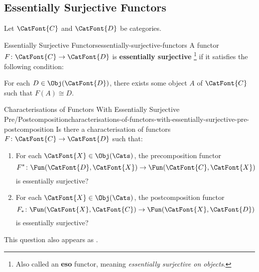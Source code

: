 \subsection{Essentially Surjective Functors}\label{subsection-essentially-surjective-functors}
Let $\CatFont{C}$ and $\CatFont{D}$ be categories.
\begin{definition}{Essentially Surjective Functors}{essentially-surjective-functors}%
    A functor $F\colon\CatFont{C}\to\CatFont{D}$ is \textbf{essentially surjective}%
    \footnote{%
        Also called an \textbf{eso} functor, meaning \emph{essentially surjective on objects}.
        \par\vspace*{\TCBBoxCorrection}
    } %
    if it satisfies the following condition:
    \begin{itemize}
        \itemstar For each $D\in\Obj(\CatFont{D})$, there exists some object $A$ of $\CatFont{C}$ such that $F(A)\cong D$.
    \end{itemize}
\end{definition}
\begin{question}{Characterisations of Functors With Essentially Surjective Pre/Postcomposition}{characterisations-of-functors-with-essentially-surjective-pre-postcomposition}%
    Is there a characterisation of functors $F\colon\CatFont{C}\to\CatFont{D}$ such that:
    \begin{enumerate}
        \item\label{characterisations-of-functors-with-essentially-surjective-pre-postcomposition-a}For each $\CatFont{X}\in\Obj(\Cats)$, the precomposition functor
            \[
                F^{*}%
                \colon%
                \Fun(\CatFont{D},\CatFont{X})%
                \to%
                \Fun(\CatFont{C},\CatFont{X})%
            \]%
            is essentially surjective?
        \item\label{characterisations-of-functors-with-essentially-surjective-pre-postcomposition-b}For each $\CatFont{X}\in\Obj(\Cats)$, the postcomposition functor
            \[
                F_{*}%
                \colon%
                \Fun(\CatFont{X},\CatFont{C})%
                \to%
                \Fun(\CatFont{X},\CatFont{D})%
            \]%
            is essentially surjective?
    \end{enumerate}
    This question also appears as \cite{MO468125}.
\end{question}
